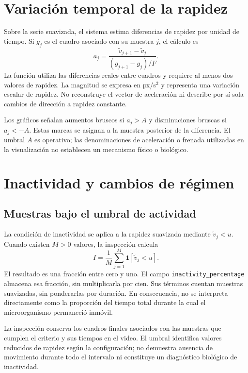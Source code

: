 \section{Variación temporal de la rapidez}

Sobre la serie suavizada, el sistema estima diferencias de rapidez por unidad de tiempo. Si $g_j$ es el cuadro asociado con su muestra $j$, el cálculo es
\begin{equation}
  a_j=\frac{\widetilde{v}_{j+1}-\widetilde{v}_j}{(g_{j+1}-g_j)/F}.
  \label{eq:variacion-rapidez-implementada}
\end{equation}
La función utiliza las diferencias reales entre cuadros y requiere al menos dos valores de rapidez. La magnitud se expresa en px/s$^2$ y representa una variación escalar de rapidez. No reconstruye el vector de aceleración ni describe por sí sola cambios de dirección a rapidez constante.

Los gráficos señalan aumentos bruscos si $a_j>A$ y disminuciones bruscas si $a_j<-A$. Estas marcas se asignan a la muestra posterior de la diferencia. El umbral $A$ es operativo; las denominaciones de aceleración o frenada utilizadas en la visualización no establecen un mecanismo físico o biológico.

\section{Inactividad y cambios de régimen}

\subsection{Muestras bajo el umbral de actividad}

La condición de inactividad se aplica a la rapidez suavizada mediante $\widetilde{v}_j<u$. Cuando existen $M>0$ valores, la inspección calcula
\begin{equation}
  I=\frac{1}{M}\sum_{j=1}^{M}\mathbf{1}[\widetilde{v}_j<u].
  \label{eq:fraccion-inactividad}
\end{equation}
El resultado es una fracción entre cero y uno. El campo \texttt{inactivity\_percentage} almacena esa fracción, sin multiplicarla por cien. Sus términos cuentan muestras suavizadas, sin ponderarlas por duración. En consecuencia, no se interpreta directamente como la proporción del tiempo total durante la cual el microorganismo permaneció inmóvil.

La inspección conserva los cuadros finales asociados con las muestras que cumplen el criterio y sus tiempos en el video. El umbral identifica valores reducidos de rapidez según la configuración; no demuestra ausencia de movimiento durante todo el intervalo ni constituye un diagnóstico biológico de inactividad.

